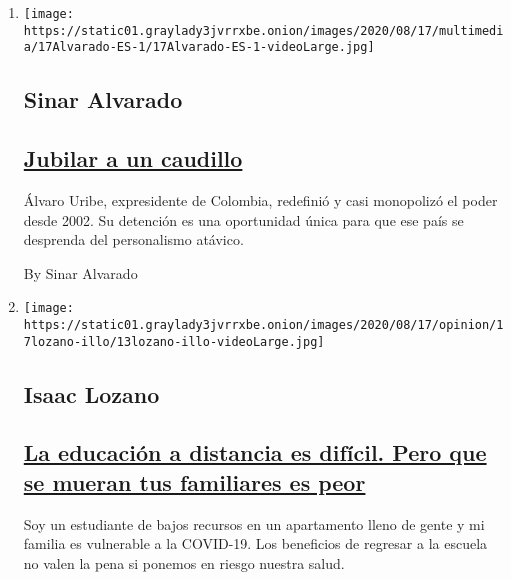 \begin{enumerate}
\def\labelenumi{\arabic{enumi}.}
\item
  \texttt{[image: https://static01.graylady3jvrrxbe.onion/images/2020/08/17/multimedia/17Alvarado-ES-1/17Alvarado-ES-1-videoLarge.jpg]}

  \hypertarget{sinar-alvarado}{%
  \subsection{Sinar Alvarado}\label{sinar-alvarado}}

  \hypertarget{jubilar-a-un-caudillo}{%
  \subsection{\texorpdfstring{\href{/es/2020/08/17/espanol/opinion/alvaro-uribe-colombia.html}{Jubilar
  a un caudillo}}{Jubilar a un caudillo}}\label{jubilar-a-un-caudillo}}

  Álvaro Uribe, expresidente de Colombia, redefinió y casi monopolizó el
  poder desde 2002. Su detención es una oportunidad única para que ese
  país se desprenda del personalismo atávico.

  By Sinar Alvarado
\item
  \texttt{[image: https://static01.graylady3jvrrxbe.onion/images/2020/08/17/opinion/17lozano-illo/13lozano-illo-videoLarge.jpg]}

  \hypertarget{isaac-lozano}{%
  \subsection{Isaac Lozano}\label{isaac-lozano}}

  \hypertarget{la-educaciuxf3n-a-distancia-es-difuxedcil-pero-que-se-mueran-tus-familiares-es-peor}{%
  \subsection{\texorpdfstring{\href{/es/2020/08/17/espanol/opinion/covid-regreso-clases-estudiante.html}{La
  educación a distancia es difícil. Pero que se mueran tus familiares es
  peor}}{La educación a distancia es difícil. Pero que se mueran tus familiares es peor}}\label{la-educaciuxf3n-a-distancia-es-difuxedcil-pero-que-se-mueran-tus-familiares-es-peor}}

  Soy un estudiante de bajos recursos en un apartamento lleno de gente y
  mi familia es vulnerable a la COVID-19. Los beneficios de regresar a
  la escuela no valen la pena si ponemos en riesgo nuestra salud.


\end{enumerate}

